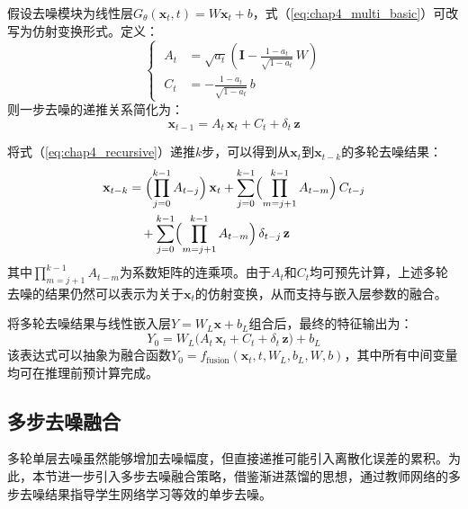 假设去噪模块为线性层$G_\theta(\mathbf{x}_t, t) = W\mathbf{x}_t + b$，式（\ref{eq:chap4_multi_basic}）可改写为仿射变换形式。定义：
\begin{equation}
\left\{\;\begin{aligned}
A_t &= \sqrt{a_t}\!\left(\mathbf{I} - \frac{1-a_t}{\sqrt{1-\bar{a}_t}}\,W\right) \\[4pt]
C_t &= -\frac{1-a_t}{\sqrt{1-\bar{a}_t}}\,b
\end{aligned}\right.
\label{eq:chap4_affine_def}
\end{equation}
则一步去噪的递推关系简化为：
\begin{equation}
\mathbf{x}_{t-1} = A_t\,\mathbf{x}_t + C_t + \delta_t\,\mathbf{z}
\label{eq:chap4_recursive}
\end{equation}

将式（\ref{eq:chap4_recursive}）递推$k$步，可以得到从$\mathbf{x}_t$到$\mathbf{x}_{t-k}$的多轮去噪结果：
\begin{equation}
\begin{aligned}
\mathbf{x}_{t-k} &= \Bigl(\prod_{j=0}^{k-1}A_{t-j}\Bigr)\,\mathbf{x}_t + \sum_{j=0}^{k-1}\Bigl(\prod_{m=j+1}^{k-1}A_{t-m}\Bigr)\,C_{t-j} \\
&\quad + \sum_{j=0}^{k-1}\Bigl(\prod_{m=j+1}^{k-1}A_{t-m}\Bigr)\,\delta_{t-j}\,\mathbf{z}
\end{aligned}
\label{eq:chap4_kstep}
\end{equation}
其中$\prod_{m=j+1}^{k-1}A_{t-m}$为系数矩阵的连乘项。由于$A_t$和$C_t$均可预先计算，上述多轮去噪的结果仍然可以表示为关于$\mathbf{x}_t$的仿射变换，从而支持与嵌入层参数的融合。

将多轮去噪结果与线性嵌入层$Y = W_L\mathbf{x} + b_L$组合后，最终的特征输出为：
\begin{equation}
Y_0 = W_L\bigl(A_t\,\mathbf{x}_t + C_t + \delta_t\,\mathbf{z}\bigr) + b_L
\label{eq:chap4_multi_output}
\end{equation}
该表达式可以抽象为融合函数$Y_0 = f_{\text{fusion}}(\mathbf{x}_t, t, W_L, b_L, W, b)$，其中所有中间变量均可在推理前预计算完成。

\subsection{多步去噪融合}

多轮单层去噪虽然能够增加去噪幅度，但直接递推可能引入离散化误差的累积。为此，本节进一步引入多步去噪融合策略，借鉴渐进蒸馏\cite{salimans2022progressive}的思想，通过教师网络的多步去噪结果指导学生网络学习等效的单步去噪。

